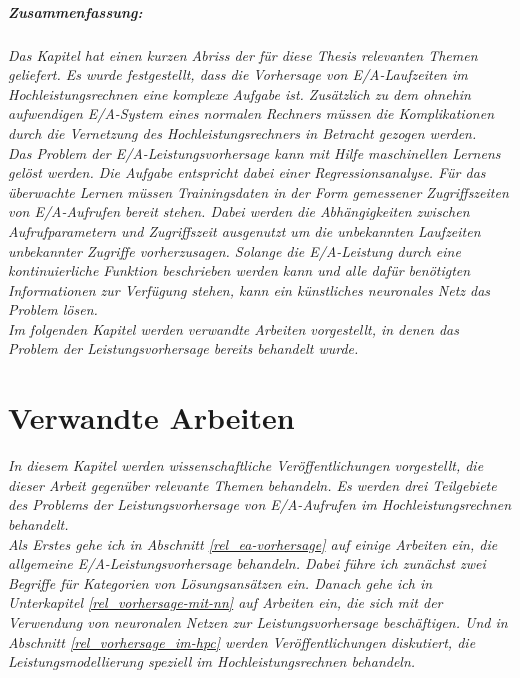 \documentclass[
	twoside,
	12pt,
	a4paper,
	BCOR10mm,
	DIV14,
	listof=totoc,
	bibliography=totoc,
	headsepline
]{scrreprt}
\begin{document}
\paragraph{Zusammenfassung:}
\textit{ 
	Das Kapitel hat einen kurzen Abriss der für diese Thesis relevanten Themen geliefert. Es wurde festgestellt, dass die Vorhersage von E/A-Laufzeiten im Hochleistungsrechnen eine komplexe Aufgabe ist. Zusätzlich zu dem ohnehin aufwendigen E/A-System eines normalen Rechners müssen die Komplikationen durch die Vernetzung des Hochleistungsrechners in Betracht gezogen werden.\\
	Das Problem der E/A-Leistungsvorhersage kann mit Hilfe maschinellen Lernens gelöst werden. Die Aufgabe entspricht dabei einer Regressionsanalyse. Für das überwachte Lernen müssen Trainingsdaten in der Form gemessener Zugriffszeiten von E/A-Aufrufen bereit stehen. Dabei werden die Abhängigkeiten zwischen Aufrufparametern und Zugriffszeit ausgenutzt um die unbekannten Laufzeiten unbekannter Zugriffe vorherzusagen.
	Solange die E/A-Leistung durch eine kontinuierliche Funktion beschrieben werden kann und alle dafür benötigten Informationen zur Verfügung stehen, kann ein künstliches neuronales Netz das Problem lösen.\\
	Im folgenden Kapitel werden verwandte Arbeiten vorgestellt, in denen das Problem der Leistungsvorhersage bereits behandelt wurde.
}

\chapter{Verwandte Arbeiten}
\label{verwandte_arbeiten}
\textit{%
	In diesem Kapitel werden wissenschaftliche Veröffentlichungen vorgestellt, die dieser Arbeit gegenüber relevante Themen behandeln. Es werden drei Teilgebiete des Problems der Leistungsvorhersage von E/A-Aufrufen im Hochleistungsrechnen behandelt.\\
	Als Erstes gehe ich in Abschnitt \ref{rel_ea-vorhersage} auf einige Arbeiten ein, die allgemeine E/A-Leistungsvorhersage behandeln. Dabei führe ich zunächst zwei Begriffe für Kategorien von Lösungsansätzen ein. Danach gehe ich in Unterkapitel \ref{rel_vorhersage-mit-nn} auf Arbeiten ein, die sich mit der Verwendung von neuronalen Netzen zur Leistungsvorhersage beschäftigen.
	Und in Abschnitt \ref{rel_vorhersage_im-hpc} werden Veröffentlichungen diskutiert, die Leistungsmodellierung speziell im Hochleistungsrechnen behandeln.
}
\bigskip
\end{document}
